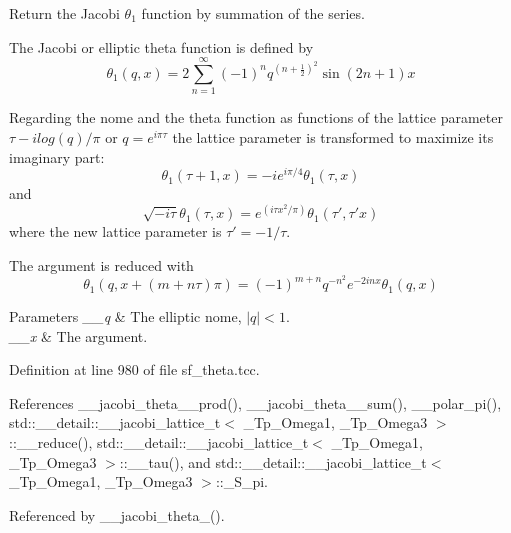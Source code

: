 Return the Jacobi $ \theta_1 $ function by summation of the series.

The Jacobi or elliptic theta function is defined by \[ \theta_1(q,x) = 2\sum_{n=1}^{\infty}(-1)^n q^{(n+\frac{1}{2})^2}\sin{(2n+1)x} \]

Regarding the nome and the theta function as functions of the lattice parameter $ \tau -i log(q)/ \pi $ or $ q = e^{i\pi\tau} $ the lattice parameter is transformed to maximize its imaginary part\+: \[ \theta_1(\tau+1,x) = -i e^{i\pi/4}\theta_1(\tau,x) \] and \[ \sqrt{-i\tau}\theta_1(\tau,x) = e^{(i\tau x^2/\pi)}\theta_1(\tau',\tau' x) \] where the new lattice parameter is $ \tau' = -1/\tau $.

The argument is reduced with \[ \theta_1(q, x+(m+n\tau)\pi) = (-1)^{m+n}q^{-n^2}e^{-2inx}\theta_1(q, x) \]


\begin{DoxyParams}{Parameters}
{\em \+\_\+\+\_\+q} & The elliptic nome, $ |q| < 1 $. \\
\hline
{\em \+\_\+\+\_\+x} & The argument. \\
\hline
\end{DoxyParams}


Definition at line 980 of file sf\+\_\+theta.\+tcc.



References \+\_\+\+\_\+jacobi\+\_\+theta\+\_\+\_\+prod(), \+\_\+\+\_\+jacobi\+\_\+theta\+\_\+\_\+sum(), \+\_\+\+\_\+polar\+\_\+pi(), std\+::\+\_\+\+\_\+detail\+::\+\_\+\+\_\+jacobi\+\_\+lattice\+\_\+t$<$ \+\_\+\+Tp\+\_\+\+Omega1, \+\_\+\+Tp\+\_\+\+Omega3 $>$\+::\+\_\+\+\_\+reduce(), std\+::\+\_\+\+\_\+detail\+::\+\_\+\+\_\+jacobi\+\_\+lattice\+\_\+t$<$ \+\_\+\+Tp\+\_\+\+Omega1, \+\_\+\+Tp\+\_\+\+Omega3 $>$\+::\+\_\+\+\_\+tau(), and std\+::\+\_\+\+\_\+detail\+::\+\_\+\+\_\+jacobi\+\_\+lattice\+\_\+t$<$ \+\_\+\+Tp\+\_\+\+Omega1, \+\_\+\+Tp\+\_\+\+Omega3 $>$\+::\+\_\+\+S\+\_\+pi.



Referenced by \+\_\+\+\_\+jacobi\+\_\+theta\+\_().

\mbox{\label{namespacestd_1_1____detail_af98af6bb3dd83f6a28c777d8fbaa5e51}} 
